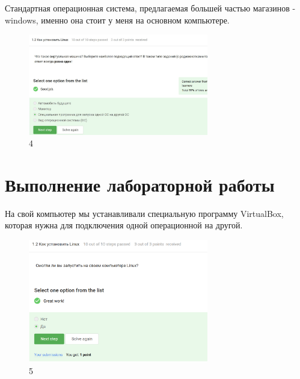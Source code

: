 Стандартная операционная система, предлагаемая большей частью магазинов
- windows, именно она стоит у меня на основном компьютере.

\begin{figure}
\hypertarget{fig:004}{%
\centering
\includegraphics[width=0.7\textwidth,height=\textheight]{image/4.png}
\caption{4}\label{fig:004}
}
\end{figure}

\hypertarget{ux432ux44bux43fux43eux43bux43dux435ux43dux438ux435-ux43bux430ux431ux43eux440ux430ux442ux43eux440ux43dux43eux439-ux440ux430ux431ux43eux442ux44b-4}{%
\section{Выполнение лабораторной
работы}\label{ux432ux44bux43fux43eux43bux43dux435ux43dux438ux435-ux43bux430ux431ux43eux440ux430ux442ux43eux440ux43dux43eux439-ux440ux430ux431ux43eux442ux44b-4}}

На свой компьютер мы устанавливали специальную программу VirtualBox,
которая нужна для подключения одной операционной на другой.

\begin{figure}
\hypertarget{fig:005}{%
\centering
\includegraphics[width=0.7\textwidth,height=\textheight]{image/5.png}
\caption{5}\label{fig:005}
}
\end{figure}

